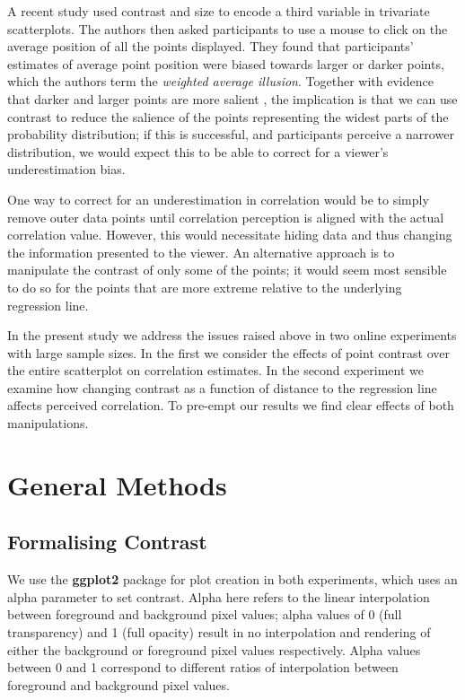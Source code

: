 \documentclass[preprint, 3p,
authoryear]{elsarticle} %
\begin{document}
A recent study \citep{hong_2021} used contrast and size to encode a
third variable in trivariate scatterplots. The authors then asked
participants to use a mouse to click on the average position of all the
points displayed. They found that participants' estimates of average
point position were biased towards larger or darker points, which the
authors term the \emph{weighted average illusion}. Together with
evidence that darker and larger points are more salient
\citep{healey_2012}, the implication is that we can use contrast to
reduce the salience of the points representing the widest parts of the
probability distribution; if this is successful, and participants
perceive a narrower distribution, we would expect this to be able to
correct for a viewer's underestimation bias.

One way to correct for an underestimation in correlation would be to
simply remove outer data points until correlation perception is aligned
with the actual correlation value. However, this would necessitate
hiding data and thus changing the information presented to the viewer.
An alternative approach is to manipulate the contrast of only some of
the points; it would seem most sensible to do so for the points that are
more extreme relative to the underlying regression line.

In the present study we address the issues raised above in two online
experiments with large sample sizes. In the first we consider the
effects of point contrast over the entire scatterplot on correlation
estimates. In the second experiment we examine how changing contrast as
a function of distance to the regression line affects perceived
correlation. To pre-empt our results we find clear effects of both
manipulations.

\hypertarget{general-methods}{%
\section{General Methods}\label{general-methods}}

\hypertarget{formalising-contrast}{%
\subsection{Formalising Contrast}\label{formalising-contrast}}

We use the \textbf{ggplot2} \citep{hadley_gg2016} package for plot
creation in both experiments, which uses an alpha parameter to set
contrast. Alpha here refers to the linear interpolation
\citep{stone_2008} between foreground and background pixel values; alpha
values of 0 (full transparency) and 1 (full opacity) result in no
interpolation and rendering of either the background or foreground pixel
values respectively. Alpha values between 0 and 1 correspond to
different ratios of interpolation between foreground and background
pixel values.
\end{document}
